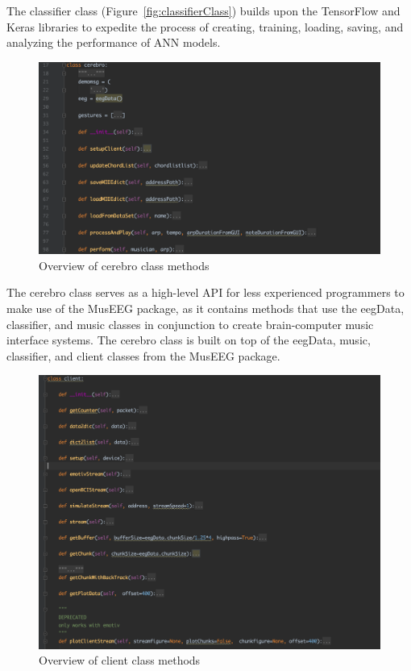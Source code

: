 	The classifier class (Figure~\ref{fig:classifierClass}) builds upon the TensorFlow and Keras libraries to expedite the process of creating, training, loading, saving, and analyzing the performance of ANN models. 

\begin{figure}[H]
	\centering
		\includegraphics[width=1\columnwidth]{cerebroClass.png}
	\caption{Overview of cerebro class methods}
	\label{fig:cerebroClass}
\end{figure}  
 
	The cerebro class serves as a high-level API for less experienced programmers to make use of the MusEEG package, as it contains methods that use the eegData, classifier, and music classes in conjunction to create brain-computer music interface systems. The cerebro class is built on top of the eegData, music, classifier, and client classes from the MusEEG package.

\begin{figure}[H]
	\centering
		\includegraphics[width=1\columnwidth]{clientClass.png}
	\caption{Overview of client class methods}
	\label{fig:clientClass}
\end{figure}  
 

